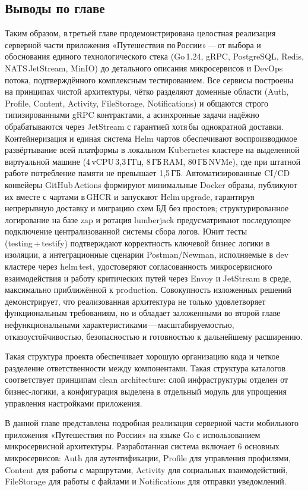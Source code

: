 \subsection*{Выводы по главе}
Таким образом, в третьей главе продемонстрирована целостная реализация серверной части приложения «Путешествия по России» — от выбора и обоснования единого технологического стека (Go 1.24, gRPC, PostgreSQL, Redis, NATS JetStream, MinIO) до детального описания микросервисов и DevOps потока, подтверждённого комплексным тестированием. Все сервисы построены на принципах чистой архитектуры, чётко разделяют доменные области (Auth, Profile, Content, Activity, FileStorage, Notifications) и общаются строго типизированными gRPC контрактами, а асинхронные задачи надёжно обрабатываются через JetStream с гарантией хотя бы однократной доставки. Контейнеризация и единая система Helm чартов обеспечивают воспроизводимое развёртывание всей платформы в локальном Kubernetes кластере на выделенной виртуальной машине (4 vCPU 3,3 ГГц, 8 ГБ RAM, 80 ГБ NVMe), где при штатной работе потребление памяти не превышает 1,5 ГБ. Автоматизированные CI/CD конвейеры GitHub Actions формируют минимальные Docker образы, публикуют их вместе с чартами в GHCR и запускают Helm upgrade, гарантируя непрерывную доставку и миграцию схем БД без простоев; структурированное логирование на базе zap и ротация lumberjack предусматривают последующее подключение централизованной системы сбора логов. Юнит тесты (testing + testify) подтверждают корректность ключевой бизнес логики в изоляции, а интеграционные сценарии Postman/Newman, исполняемые в dev кластере через helm test, удостоверяют согласованность микросервисного взаимодействия и работу критических путей через Envoy и JetStream в среде, максимально приближённой к production. Совокупность изложенных решений демонстрирует, что реализованная архитектура не только удовлетворяет функциональным требованиям, но и обладает заложенными во второй главе нефункциональными характеристиками — масштабируемостью, отказоустойчивостью, безопасностью и готовностью к дальнейшему расширению.

\noindent Такая структура проекта обеспечивает хорошую организацию кода и четкое разделение ответственности между компонентами. Такая структура каталогов соответствует принципам clean architecture: слой инфраструктуры отделен от бизнес-логики, а конфигурация выделена в отдельный модуль для упрощения управления настройками приложения.

\noindent В данной главе представлена подробная реализация серверной части мобильного приложения «Путешествия по России» на языке Go с использованием микросервисной архитектуры. Разработанная система включает 6 основных микросервисов: Auth для аутентификации, Profile для управления профилями, Content для работы с маршрутами, Activity для социальных взаимодействий, FileStorage для работы с файлами и Notifications для отправки уведомлений.
